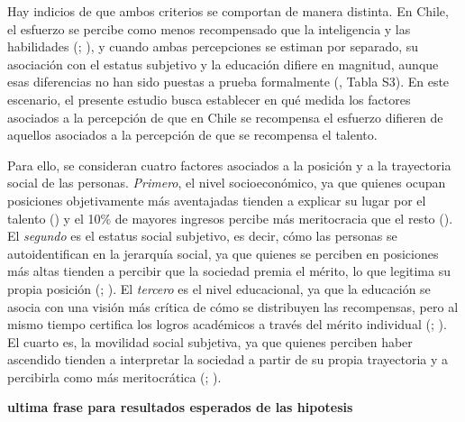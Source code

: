 \documentclass[
  spanish,
  a4paper,
  oneside]{scrbook}
\begin{document}
Hay indicios de que ambos criterios se comportan de manera distinta. En
Chile, el esfuerzo se percibe como menos recompensado que la
inteligencia y las habilidades
(; ), y cuando ambas percepciones se estiman por separado, su
asociación con el estatus subjetivo y la educación difiere en magnitud,
aunque esas diferencias no han sido puestas a prueba formalmente
(, Tabla S3). En este escenario, el presente estudio busca
establecer en qué medida los factores asociados a la percepción de que
en Chile se recompensa el esfuerzo difieren de aquellos asociados a la
percepción de que se recompensa el talento.

Para ello, se consideran cuatro factores asociados a la posición y a la
trayectoria social de las personas. \emph{Primero}, el nivel
socioeconómico, ya que quienes ocupan posiciones objetivamente más
aventajadas tienden a explicar su lugar por el talento
() y el 10\% de mayores ingresos percibe más meritocracia que el
resto (). El \emph{segundo} es el estatus social subjetivo, es
decir, cómo las personas se autoidentifican en la jerarquía social, ya
que quienes se perciben en posiciones más altas tienden a percibir que
la sociedad premia el mérito, lo que legitima su propia posición
(;
). El \emph{tercero} es el nivel educacional, ya que la educación
se asocia con una visión más crítica de cómo se distribuyen las
recompensas, pero al mismo tiempo certifica los logros académicos a
través del mérito individual
(;
). El cuarto es, la movilidad social subjetiva, ya que quienes
perciben haber ascendido tienden a interpretar la sociedad a partir de
su propia trayectoria y a percibirla como más meritocrática
(;
).

\textbf{ultima frase para resultados esperados de las hipotesis}
\end{document}
